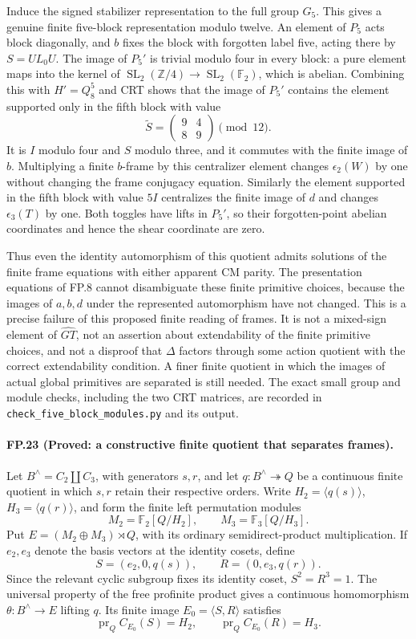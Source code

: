 Induce the signed stabilizer representation to the full group $G_5$.
This gives a genuine finite five-block representation modulo twelve.
An element of $P_5$ acts block diagonally, and $b$ fixes the block with
forgotten label five, acting there by $S=UL_0U$.
The image of $P_5'$ is trivial modulo four in every block: a pure element
maps into the kernel of
$\operatorname{SL}_2(\mathbb Z/4)\to\operatorname{SL}_2(\mathbb F_2)$,
which is abelian. Combining this with $H'=Q_8^5$ and CRT shows that the
image of $P_5'$ contains the element supported only in the fifth block
with value
\[
 \widetilde S=\begin{pmatrix}9&4\\8&9\end{pmatrix}\pmod{12}.
\]
It is $I$ modulo four and $S$ modulo three, and it commutes with the
finite image of $b$. Multiplying a finite $b$-frame by this centralizer
element changes $\epsilon_2(W)$ by one without changing the frame
conjugacy equation. Similarly the element supported in the fifth block
with value $5I$ centralizes the finite image of $d$ and changes
$\epsilon_3(T)$ by one. Both toggles have lifts in $P_5'$, so their
forgotten-point abelian coordinates and hence the shear coordinate are
zero.

Thus even the identity automorphism of this quotient admits solutions of
the finite frame equations with either apparent CM parity. The
presentation equations of FP.8 cannot disambiguate these finite primitive
choices, because the images of $a,b,d$ under the represented automorphism
have not changed. This is a precise failure of this proposed finite
reading of frames. It is not a mixed-sign element of $\widehat{GT}$, not
an assertion about extendability of the finite primitive choices, and not
a disproof that $\Delta$ factors through some action quotient with the
correct extendability condition. A finer finite quotient in which the
images of actual global primitives are separated is still needed.
The exact small group and module checks, including the two CRT matrices,
are recorded in \texttt{check\_five\_block\_modules.py} and its output.

\paragraph{FP.23 (Proved: a constructive finite quotient that separates frames).}
Let $B^\wedge=C_2\amalg C_3$, with generators $s,r$, and let
$q:B^\wedge\twoheadrightarrow Q$ be a continuous finite quotient in which
$s,r$ retain their respective orders. Write $H_2=\langle q(s)\rangle$,
$H_3=\langle q(r)\rangle$, and form the finite left permutation modules
\[
 M_2=\mathbb F_2[Q/H_2],\qquad M_3=\mathbb F_3[Q/H_3].
\]
Put $E=(M_2\oplus M_3)\rtimes Q$, with its ordinary semidirect-product
multiplication. If $e_2,e_3$ denote the basis vectors at the identity
cosets, define
\[
 S=(e_2,0,q(s)),\qquad R=(0,e_3,q(r)).
\]
Since the relevant cyclic subgroup fixes its identity coset, $S^2=R^3=1$.
The universal property of the free profinite product gives a continuous
homomorphism $\theta:B^\wedge\to E$ lifting $q$. Its finite image
$E_0=\langle S,R\rangle$ satisfies
\[
 \operatorname{pr}_Q C_{E_0}(S)=H_2,\qquad
 \operatorname{pr}_Q C_{E_0}(R)=H_3.
\]

